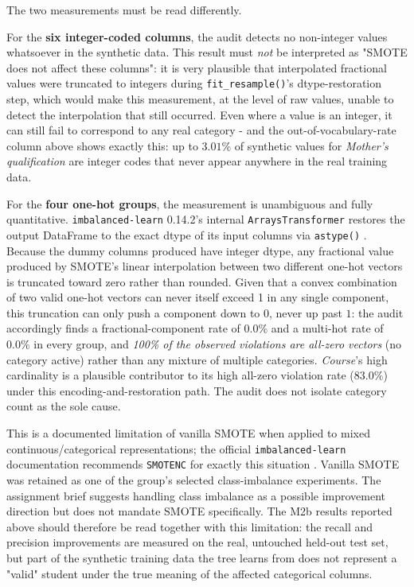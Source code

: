 The two measurements must be read differently.

For the \textbf{six integer-coded columns}, the audit detects no non-integer
values whatsoever in the synthetic data. This result must \emph{not} be
interpreted as "SMOTE does not affect these columns": it is very plausible that
interpolated fractional values were truncated to integers during
\texttt{fit\_resample()}'s dtype-restoration step, which would make this
measurement, at the level of raw values, unable to detect the interpolation that
still occurred. Even where a value is an integer, it can still fail to correspond
to any real category - and the out-of-vocabulary-rate column above shows exactly
this: up to $3.01\%$ of synthetic values for \textit{Mother's qualification} are
integer codes that never appear anywhere in the real training data.

For the \textbf{four one-hot groups}, the measurement is unambiguous and fully
quantitative. \texttt{imbalanced-learn} 0.14.2's internal \texttt{ArraysTransformer}
restores the output DataFrame to the exact dtype of its input columns via
\texttt{astype()} \citep{imblearn_arrays_transformer}. Because the dummy columns
produced have integer dtype, any fractional value produced
by SMOTE's linear interpolation between two different one-hot vectors is truncated
toward zero rather than rounded. Given that a convex combination of two valid
one-hot vectors can never itself exceed 1 in any single component, this truncation
can only push a component down to $0$, never up past $1$: the audit accordingly
finds a fractional-component rate of $0.0\%$ and a multi-hot rate of $0.0\%$ in
every group, and \emph{100\% of the observed violations are all-zero vectors}
(no category active) rather than any mixture of multiple categories. \textit{Course}'s high cardinality is a plausible contributor to its high all-zero violation rate ($83.0\%$) under this encoding-and-restoration path. The audit does not isolate category count as the sole cause.

This is a documented limitation of vanilla SMOTE when applied to mixed
continuous/categorical representations; the official \texttt{imbalanced-learn}
documentation recommends \texttt{SMOTENC} for exactly this situation
\citep{imblearn_oversampling_guide}. Vanilla SMOTE was retained as one of the group's selected class-imbalance experiments. The assignment brief suggests handling class imbalance as a possible improvement direction but does not mandate SMOTE specifically. The M2b results reported above should
therefore be read together with this limitation: the recall and precision
improvements are measured on the real, untouched held-out test set, but
part of the synthetic training data the tree learns from does not represent a
"valid" student under the true meaning of the affected categorical columns.

